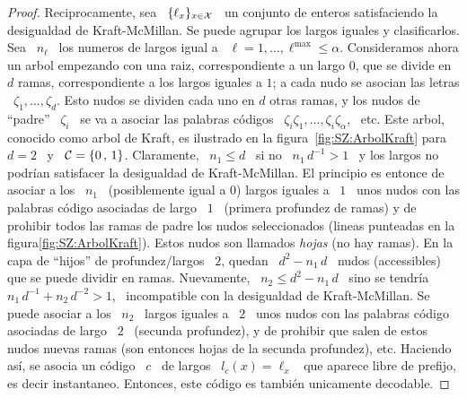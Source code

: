 \begin{proof}
  Reciprocamente,  sea \  $\{ \ell_x  \}_{x \in  \mathcal{X}}$ \  un conjunto  de enteros
  satisfaciendo la  desigualdad de Kraft-McMillan.  Se puede  agrupar los largos
  iguales y  clasificarlos. Sea  \ $n_\ell$ \  los numeros  de largos igual  a \
  $\ell =  1 , \ldots  , \ell^{\max} \le  \alpha$.  Consideramos ahora  un arbol
  empezando con una  raiz, correspondiente a un largo $0$, que  se divide en $d$
  ramas, correspondiente a los largos iguales  a $1$; a cada nudo se asocian las
  letras \  $\zeta_1, \ldots , \zeta_d$. Esto  nudos se dividen cada  uno en $d$
  otras  ramas, y  los nudos  de ``padre''  \ $\zeta_i$  \ se  va a  asociar las
  palabras c\'odigos \ $\zeta_i \zeta_1 , \ldots , \zeta_i \zeta_\alpha$, \ etc.
  Este   arbol,   conocido  como   arbol   de   Kraft,   es  ilustrado   en   la
  figura~\ref{fig:SZ:ArbolKraft}  para \ $d  = 2$  \ y  \ $\mathcal{C}  = \{0  \, ,  \, 1
  \}$. Claramente, \ $n_1 \le d$ \ si no \ $n_1 \, d^{-1} > 1$ \ y los largos no
  podr\'ian  satisfacer  la  desigualdad  de Kraft-McMillan.   El  principio  es
  entonce de asociar a los \ $n_1$ \ (posiblemente igual a 0) largos iguales a \
  $1$ \ unos nudos con las palabras c\'odigo asociadas de largo \ $1$ \ (primera
  profundez  de  ramas)  y de  prohibir  todos  las  ramas  de padre  los  nudos
  seleccionados  (lineas punteadas  en la  figura\ref{fig:SZ:ArbolKraft}). Estos
  nudos son  llamados {\em hojas}  (no hay ramas).   En la capa de  ``hijos'' de
  profundez/largos \ $2$, quedan \ $d^2 - n_1 \, d$ \ nudos (accessibles) que se
  puede dividir  en ramas.  Nuevamente,  \ $n_2 \le  d^2 - n_1  \, d$ \  sino se
  tendr\'ia  \ $n_1  \, d^{-1}  + n_2  \,  d^{-2} >  1$, \  incompatible con  la
  desigualdad de Kraft-McMillan. Se puede asociar a los \ $n_2$ \ largos iguales
  a \  $2$ \ unos  nudos con las  palabras c\'odigo asociadas  de largo \  $2$ \
  (secunda profundez), y de prohibir que  salen de estos nudos nuevas ramas (son
  entonces hojas  de la  secunda profundez), etc.  Haciendo as\'i, se  asocia un
  c\'odigo \ $c$ \ de largos \ $l_c(x) = \ell_x$ \ que aparece libre de prefijo,
  es  decir  instantaneo.   Entonces,  este  c\'odigo  es  tambi\'en  unicamente
  decodable.
\end{proof}

